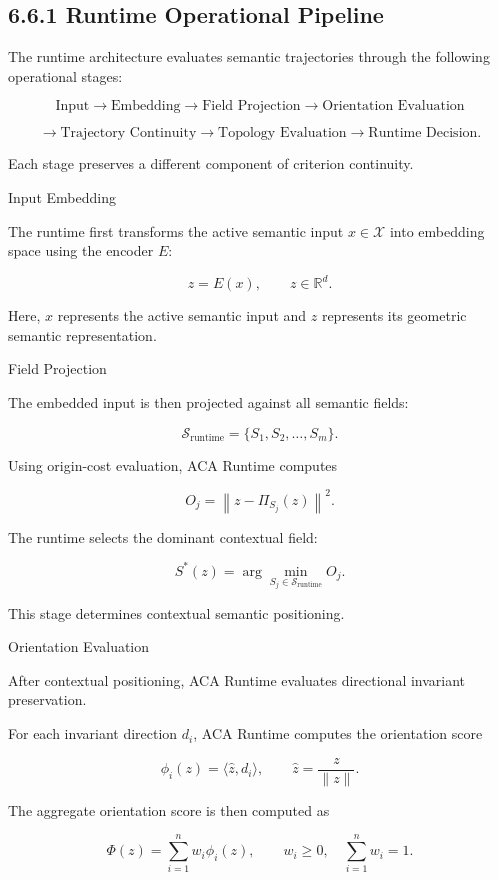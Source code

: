 \documentclass[11pt]{article}
\begin{document}
\subsection{6.6.1 Runtime Operational Pipeline}

The runtime architecture evaluates semantic trajectories through the following operational stages:

$$
\text{Input}
\rightarrow
\text{Embedding}
\rightarrow
\text{Field Projection}
\rightarrow
\text{Orientation Evaluation}
$$

$$
\rightarrow
\text{Trajectory Continuity}
\rightarrow
\text{Topology Evaluation}
\rightarrow
\text{Runtime Decision}.
$$

Each stage preserves a different component of criterion continuity.

Input Embedding

The runtime first transforms the active semantic input $x\in\mathcal{X}$ into embedding space using the encoder $E$:

$$
z = E(x), \qquad z\in\mathbb{R}^{d}.
$$

Here, $x$ represents the active semantic input and $z$ represents its geometric semantic representation.

Field Projection

The embedded input is then projected against all semantic fields:

$$
\mathcal{S}_{\mathrm{runtime}}
=
\{S_1,S_2,\dots,S_m\}.
$$

Using origin-cost evaluation, ACA Runtime computes

$$
O_j
=
\left\lVert
z-\Pi_{S_j}(z)
\right\rVert^2.
$$

The runtime selects the dominant contextual field:

$$
S^{*}(z)
=
\arg\min_{S_j\in\mathcal{S}_{\mathrm{runtime}}}
O_j.
$$

This stage determines contextual semantic positioning.

Orientation Evaluation

After contextual positioning, ACA Runtime evaluates directional invariant preservation.

For each invariant direction $d_i$, ACA Runtime computes the orientation score

$$
\phi_i(z)=\langle \hat{z},d_i\rangle,
\qquad
\hat{z}=\frac{z}{\lVert z\rVert}.
$$

The aggregate orientation score is then computed as

$$
\Phi(z)=\sum_{i=1}^{n}w_i\phi_i(z),
\qquad
w_i\geq 0,\quad \sum_{i=1}^{n}w_i=1.
$$
\end{document}
